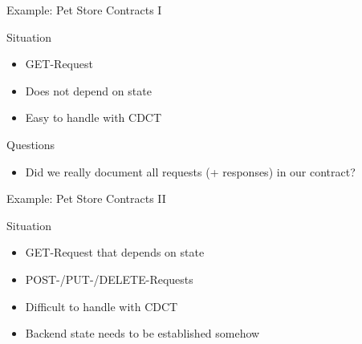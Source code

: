 \begin{frame}[fragile]{}
\end{frame}


\begin{frame}[fragile]{Example: Pet Store Contracts I}

  

\end{frame}


\begin{frame}[fragile]{Situation}

\begin{itemize}[<+->]
\item GET-Request
\item Does not depend on state
\item Easy to handle with CDCT
\end{itemize}
\end{frame}

\begin{frame}[fragile]{Questions}

\begin{itemize}[<+->]
\item Did we really document all requests (+ responses) in our contract?
\end{itemize}

\end{frame}


\begin{frame}[fragile]{Example: Pet Store Contracts II}

  

\end{frame}


\begin{frame}[fragile]{Situation}

\begin{itemize}[<+->]
\item GET-Request that depends on state
\item POST-/PUT-/DELETE-Requests
\item Difficult to handle with CDCT
\item Backend state needs to be established somehow
\end{itemize}
\end{frame}


